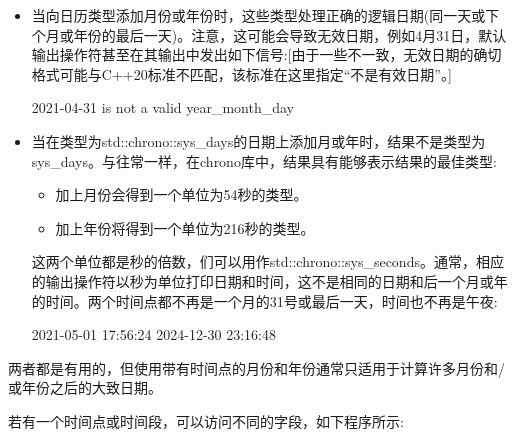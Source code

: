 \begin{itemize}
\item
当向日历类型添加月份或年份时，这些类型处理正确的逻辑日期(同一天或下个月或年份的最后一天)。注意，这可能会导致无效日期，例如4月31日，默认输出操作符甚至在其输出中发出如下信号:[由于一些不一致，无效日期的确切格式可能与C++20标准不匹配，该标准在这里指定“不是有效日期”。]

\begin{shell}
2021-04-31 is not a valid year_month_day
\end{shell}

\item
当在类型为std::chrono::sys\_days的日期上添加月或年时，结果不是类型为sys\_days。与往常一样，在chrono库中，结果具有能够表示结果的最佳类型:

\begin{itemize}
\item
加上月份会得到一个单位为54秒的类型。

\item
加上年份将得到一个单位为216秒的类型。
\end{itemize}

这两个单位都是秒的倍数，们可以用作std::chrono::sys\_seconds。通常，相应的输出操作符以秒为单位打印日期和时间，这不是相同的日期和后一个月或年的时间。两个时间点都不再是一个月的31号或最后一天，时间也不再是午夜:

\begin{shell}
2021-05-01 17:56:24
2024-12-30 23:16:48
\end{shell}

\end{itemize}

两者都是有用的，但使用带有时间点的月份和年份通常只适用于计算许多月份和/或年份之后的大致日期。


若有一个时间点或时间段，可以访问不同的字段，如下程序所示:


